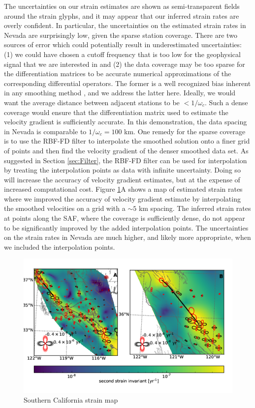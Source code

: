 \documentclass[10pt,a4paper]{article}
\begin{document}
The uncertainties on our strain estimates are shown as semi-transparent fields around the strain glyphs, and it may appear that our inferred strain rates are overly confident. In particular, the uncertainties on the estimated strain rates in Nevada are surprisingly low, given the sparse station coverage.  There are two sources of error which could potentially result in underestimated uncertainties: (1) we could have chosen a cutoff frequency that is too low for the geophysical signal that we are interested in and (2) the data coverage may be too sparse for the differentiation matrices to be accurate numerical approximations of the corresponding differential operators. The former is a well recognized bias inherent in any smoothing method \citep{Hastie1990}, and we address the latter here. Ideally, we would want the average distance between adjacent stations to be ${<}1/\omega_c$. Such a dense coverage would ensure that the differentiation matrix used to estimate the velocity gradient is sufficiently accurate. In this demonstration, the data spacing in Nevada is comparable to $1/\omega_c=100$ km. One remedy for the sparse coverage is to use the RBF-FD filter to interpolate the smoothed solution onto a finer grid of points and then find the velocity gradient of the denser smoothed data set. As suggested in Section \ref{sec:Filter}, the RBF-FD filter can be used for interpolation by treating the interpolation points as data with infinite uncertainty. Doing so will increase the accuracy of velocity gradient estimates, but at the expense of increased computational cost.  Figure \ref{fig:SoCal2}A shows a map of estimated strain rates where we improved the accuracy of velocity gradient estimate by interpolating the smoothed velocities on a grid with a ${\sim}5$ km spacing.  The inferred strain rates at points along the SAF, where the coverage is sufficiently dense, do not appear to be significantly improved by the added interpolation points. The uncertainties on the strain rates in Nevada are much higher, and likely more appropriate, when we included the interpolation points.

\begin{figure}
\includegraphics[scale=1.0]{figures/figure6}
\caption{Southern California strain map}   
\label{fig:SoCal2}
\end{figure}
\end{document}
